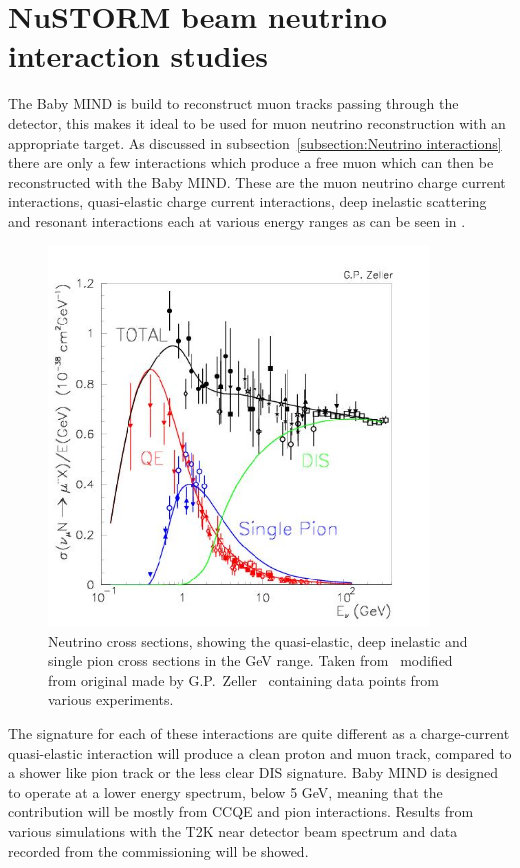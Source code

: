 \chapter{NuSTORM beam neutrino interaction studies}
\label{c:neutrinoNuSTORM}

The Baby MIND is build to reconstruct muon tracks passing through the detector, this makes it ideal to be used for muon neutrino reconstruction with an appropriate target. As discussed in subsection~\ref{subsection:Neutrino interactions} there are only a few interactions which produce a free muon which can then be reconstructed with the Baby MIND. These are the muon neutrino charge current interactions, quasi-elastic charge current interactions, deep inelastic scattering and resonant interactions each at various energy ranges as can be seen in .

\begin{figure}[h!]
\centering
\includegraphics[width=0.9\textwidth]{figures/figs_zeller-total-numode.png}
\caption{Neutrino cross sections, showing the quasi-elastic, deep inelastic and single pion cross sections in the GeV range. Taken from~\cite{82McFarland} modified from original made by G.P.~Zeller~\cite{13PDG} containing data points from various experiments.}
\label{fig:neutrinoInteractionsFig}
\end{figure}

The signature for each of these interactions are quite different as a charge-current quasi-elastic interaction will produce a clean proton and muon track, compared to a shower like pion track or the less clear DIS signature. Baby MIND is designed to operate at a lower energy spectrum, below 5 GeV, meaning that the contribution will be mostly from CCQE and pion interactions. Results from various simulations with the T2K near detector beam spectrum and data recorded from the commissioning will be showed.

